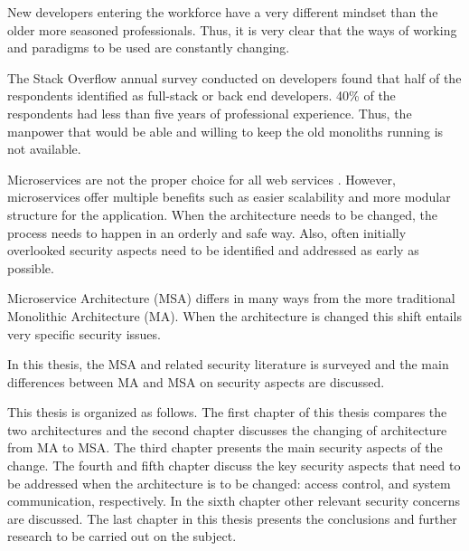 \begin{sloppypar}
    New developers entering the workforce have a very different mindset than the
    older more seasoned professionals. Thus, it is very clear that the ways of
    working and paradigms to be used are constantly changing. 
\end{sloppypar}
\begin{sloppypar}
    The Stack Overflow annual survey \citep{sosurvey2019} conducted on
    developers found that half of the respondents identified as full-stack or
    back end developers. 40\% of the respondents had less than five years of
    professional experience. Thus, the manpower that would be able and willing to keep
    the old monoliths running is not available.
\end{sloppypar}
\begin{sloppypar}
    Microservices are not the proper choice for all web services
    \citep{newman2019}. However, microservices offer multiple benefits such as
    easier scalability and more modular structure for the application. When the
    architecture needs to be changed, the process needs to happen in an orderly
    and safe way. Also, often initially overlooked security aspects need to be
    identified and addressed as early as possible.
\end{sloppypar}
\begin{sloppypar}
    Microservice Architecture (MSA) differs in many ways from the more
    traditional Monolithic Architecture (MA). When the architecture is changed
    this shift entails very specific security issues.
\end{sloppypar}
\begin{sloppypar}
    In this thesis, the MSA and related security literature is surveyed and the
    main differences between MA and MSA on security aspects are discussed.
\end{sloppypar}
\begin{sloppypar}
    This thesis is organized as follows. The first chapter of this thesis
    compares the two architectures and the second chapter discusses the changing
    of architecture from MA to MSA. The third chapter presents the main security
    aspects of the change. The fourth and fifth chapter discuss
    the key security aspects that need to be addressed when the architecture is
    to be changed: access control, and system communication, respectively. In
    the sixth chapter other relevant security concerns are discussed. The last
    chapter in this thesis presents the conclusions and further research to be
    carried out on the subject.
\end{sloppypar}



